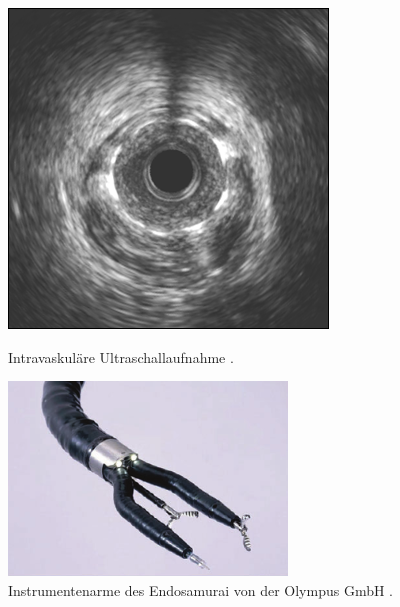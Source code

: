 \begin{figure}[!htb]
		\includegraphics[width=\linewidth]{Content/Pictures/ivus.png}
		\caption{Intravaskuläre Ultraschallaufnahme \cite{IVUS}.} 
		\label{fig:us}
	\endminipage\hfill
		\includegraphics[width=\linewidth]{Content/Pictures/endo.png}
		\caption{Instrumentenarme des Endosamurai von der Olympus GmbH \cite{EndosamuraiBild}.} 
		\label{fig:endosamurai}
	\endminipage
\end{figure}

